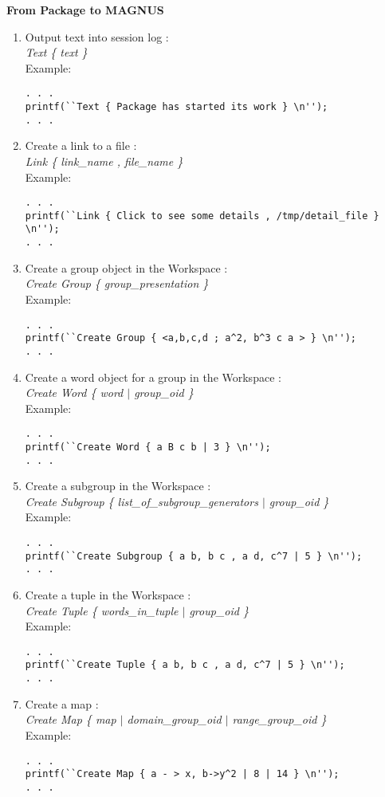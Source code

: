\documentclass[12pt]{article}
\def\magnus{MAGNUS }
\begin{document}
\textbf{ From Package to \magnus }
\begin{enumerate}
\item Output text into session log : \\
{\em Text \{ text \} } \\
Example:
\begin{verbatim}
. . .
printf(``Text { Package has started its work } \n'');
. . .
\end{verbatim}

\item Create a link to a file : \\
{\em Link \{ link\_name , file\_name \} } \\
Example:
\begin{verbatim}
. . .
printf(``Link { Click to see some details , /tmp/detail_file } \n'');
. . .
\end{verbatim}
\item Create a group object in the Workspace : \\
{\em Create Group \{ group\_presentation \} } \\
Example:
\begin{verbatim}
. . .
printf(``Create Group { <a,b,c,d ; a^2, b^3 c a > } \n'');
. . .
\end{verbatim}
\item Create a word object for a group in the Workspace : \\
{\em Create Word \{ word $|$ group\_oid \} } \\
Example:
\begin{verbatim}
. . .
printf(``Create Word { a B c b | 3 } \n'');
. . .
\end{verbatim}
\item Create a subgroup in the Workspace : \\
{\em Create Subgroup \{ list\_of\_subgroup\_generators $|$ group\_oid \} }\\
Example:
\begin{verbatim}
. . .
printf(``Create Subgroup { a b, b c , a d, c^7 | 5 } \n'');
. . .
\end{verbatim}
\item Create a tuple in the Workspace : \\
{\em Create Tuple \{ words\_in\_tuple $|$ group\_oid \} }\\
Example:
\begin{verbatim}
. . .
printf(``Create Tuple { a b, b c , a d, c^7 | 5 } \n'');
. . .
\end{verbatim}
\item Create a map : \\
{\em Create Map \{ map $|$ domain\_group\_oid $|$ range\_group\_oid \} }\\
Example:
\begin{verbatim}
. . .
printf(``Create Map { a - > x, b->y^2 | 8 | 14 } \n'');
. . .
\end{verbatim}
\end{enumerate}
\end{document}
